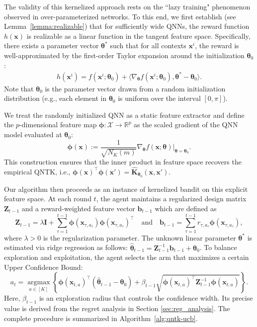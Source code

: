 \documentclass[pdflatex,sn-mathphys-num]{sn-jnl}%
\theoremstyle{thmstyleone}%
\theoremstyle{thmstyletwo}%
\theoremstyle{thmstylethree}%
\newcommand{\xbf}{\mathbf{x}}
\newcommand{\Kbf}{\mathbf{K}}
\newcommand{\Ibf}{\mathbf{I}}
\newcommand{\phibf}{\bm{\phi}}
\newcommand{\Zbf}{\mathbf{Z}}
\newcommand{\bbf}{\mathbf{b}}
\newcommand{\thetabf}{\bm{\theta}}
\begin{document}
The validity of this kernelized approach rests on the ``lazy training" phenomenon observed in over-parameterized networks. To this end, we first establish (see Lemma~\ref{lemma:realizable}) that for sufficiently wide QNNs, the reward function $h(\xbf)$ is realizable as a linear function in the tangent feature space. Specifically, there exists a parameter vector $\thetabf^*$ such that for all contexts $\xbf^i$, the reward is well-approximated by the first-order Taylor expansion around the initialization $\thetabf_0$: 
\begin{align}h(\xbf^i)= f(\xbf^i;\thetabf_0)+\langle \nabla_{\thetabf}f(\xbf^i;\thetabf_0),\thetabf^*-\thetabf_0\rangle. \label{eq:linearized_model}\end{align} Note that $\bm{\theta}_0$ is the parameter vector drawn from a random initialization distribution (e.g., each element in $\bm{\theta}_0$ is uniform over the interval $[0,\pi]$). %

We treat the randomly initialized QNN as a static feature extractor and define the $p$-dimensional feature map $\phibf: \mathcal{X} \to \mathbb{R}^p$ as the scaled gradient of the QNN model evaluated at ${\thetabf}_0$:
\begin{equation}\label{eq:feature-map}
\phibf(\xbf) := \frac{1}{\sqrt{N_K(m)}}\nabla_{\thetabf} f(\xbf;{\thetabf} )\big|_{{\thetabf}={\thetabf}_0}.
\end{equation}
This construction ensures that the inner product in feature space recovers the empirical QNTK, i.e., $\phibf(\xbf)^\top \phibf(\xbf') = \hat{\Kbf}_{\bm{\theta}_0}(\xbf, \xbf')$.


Our algorithm then proceeds as an instance of kernelized bandit \cite{valko2013finite} on this explicit feature space.  
At each round $t$, the agent maintains a regularized design matrix $\Zbf_{t-1}$ and a reward-weighted feature vector $\bbf_{t-1}$ which are defined as 
$$\Zbf_{t-1} = \lambda \Ibf + \sum_{\tau=1}^{t-1} \phibf(\xbf_{\tau, a_\tau}) \phibf(\xbf_{\tau, a_\tau})^\top 
\quad\mbox{and}\quad \bbf_{t-1} = \sum_{\tau=1}^{t-1} r_{\tau,a_{\tau}} \phibf(\xbf_{\tau, a_\tau}),$$
where $\lambda > 0$ is the regularization parameter.
The unknown linear parameter $\bm{\theta}^*$ %
is estimated via ridge regression as follows: $\hat{\bm{\theta}}_{t-1} = \Zbf_{t-1}^{-1} \bbf_{t-1} +\thetabf_0$.  
To balance exploration and exploitation, the agent selects the arm that maximizes a certain Upper Confidence Bound:
$$a_t = \operatorname*{arg max}_{a \in [K]} \left\{ \phibf(\xbf_{t,a})^\top (\hat{\bm{\theta}}_{t-1}-\thetabf_0) + \beta_{t-1} \sqrt{\phibf(\xbf_{t,a})^\top \Zbf_{t-1}^{-1} \phibf(\xbf_{t,a})} \right\}.$$
Here, $\beta_{t-1}$ is an exploration radius that controls the confidence width. Its precise value is derived from the regret analysis in Section \ref{sec:reg_analysis}. The complete procedure is summarized in Algorithm~\ref{alg:qntk-ucb}.
\end{document}
